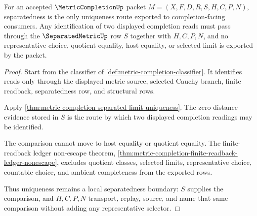 \begin{theorem}
\label{thm:metriccompletion-separated-limit-uniqueness}
For an accepted $\MetricCompletionUp$ packet $M=(X,F,D,R,S,H,C,P,N)$, separatedness is the only uniqueness route exported to completion-facing consumers. Any identification of two displayed completion reads must pass through the $\SeparatedMetricUp$ row $S$ together with $H,C,P,N$, and no representative choice, quotient equality, host equality, or selected limit is exported by the packet.
\end{theorem}
\begin{proof}
Start from the classifier of \autoref{def:metric-completion-classifier}. It identifies reads only through the displayed metric source, selected Cauchy branch, finite readback, separatedness row, and structural rows.

Apply \autoref{thm:metric-completion-separated-limit-uniqueness}. The zero-distance evidence stored in $S$ is the route by which two displayed completion readings may be identified.

The comparison cannot move to host equality or quotient equality. The finite-readback ledger non-escape theorem, \autoref{thm:metric-completion-finite-readback-ledger-nonescape}, excludes quotient classes, selected limits, representative choice, countable choice, and ambient completeness from the exported rows.

Thus uniqueness remains a local separatedness boundary: $S$ supplies the comparison, and $H,C,P,N$ transport, replay, source, and name that same comparison without adding any representative selector.
\end{proof}

